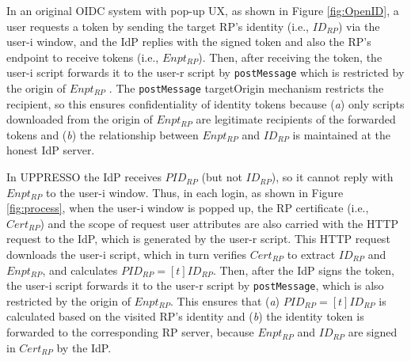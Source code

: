 In an original OIDC system with pop-up UX, as shown in Figure \ref{fig:OpenID},
    a user requests a token by sending the target RP's identity (i.e., $ID_{RP}$) via the user-i window,
    and the IdP replies with the signed token and also the RP's endpoint to receive tokens (i.e., $Enpt_{RP}$).
Then, after receiving the token, the user-i script forwards it to the user-r script by \verb+postMessage+
    which is restricted by the origin of $Enpt_{RP}$ \cite{SPRESSO,MITREid,BrowserID,GoogleIdIntegrate,de2014oauth,OpenIDConnect}.
The \verb+postMessage+ targetOrigin mechanism \cite{postm-targeto} restricts the recipient,
so this ensures confidentiality of identity tokens because (\emph{a}) only scripts downloaded from the origin of $Enpt_{RP}$ are legitimate recipients of the forwarded tokens
    and (\emph{b}) the relationship between $Enpt_{RP}$ and $ID_{RP}$ is maintained at the honest IdP server.

In UPPRESSO the IdP receives $PID_{RP}$ (but not $ID_{RP}$),
    so it cannot reply with $Enpt_{RP}$ to the user-i window.
%
%
Thus, in each login, 
as shown in Figure \ref{fig:process},
when the user-i window is popped up,
    the RP certificate (i.e., $Cert_{RP}$) and the scope of request user attributes are also carried with the HTTP request to the IdP,
    which is generated by the user-r script.
This HTTP request downloads the user-i script,
    which in turn verifies $Cert_{RP}$ to extract $ID_{RP}$ and $Enpt_{RP}$, and calculates $PID_{RP} = [t]ID_{RP}$. %
Then, after the IdP signs the token,
    the user-i script forwards it to the user-r script by \verb+postMessage+,
    which is also restricted by the origin of $Enpt_{RP}$.
This ensures that (\emph{a}) $PID_{RP} = [t]{ID_{RP}}$ is calculated based on the visited RP's identity and (\emph{b}) the identity token is forwarded to the corresponding RP server,
    because $Enpt_{RP}$ and $ID_{RP}$ are signed in $Cert_{RP}$ by the IdP.

